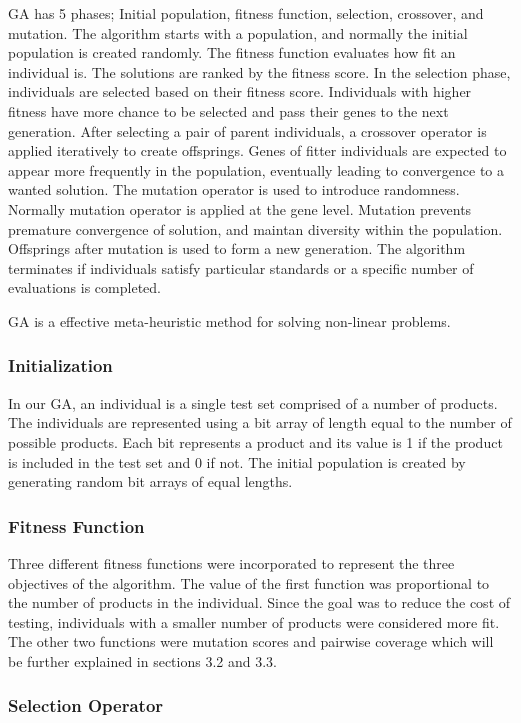 \documentclass[a4paper,12pt]{article}
\begin{document}
GA has 5 phases; Initial population, fitness function, selection, crossover, and mutation.
The algorithm starts with a population, and normally the initial population is created randomly. The fitness function evaluates how fit an individual is. The solutions are ranked by the fitness score. In the selection phase, individuals are selected based on their fitness score. Individuals with higher fitness have more chance to be selected and pass their genes to the next generation. After selecting a pair of parent individuals, a crossover operator is applied iteratively to create offsprings. Genes of fitter individuals are expected to appear more frequently in the population, eventually leading to convergence to a wanted solution. The mutation operator is used to introduce randomness. Normally mutation operator is applied at the gene level. Mutation prevents premature convergence of solution, and maintan diversity within the population. Offsprings after mutation is used to form a new generation. The algorithm terminates if individuals satisfy particular standards or a specific number of evaluations is completed.

GA is a effective meta-heuristic method for solving non-linear problems.

\subsubsection{Initialization}
In our GA, an individual is a single test set comprised of a number of products. The individuals are represented using a bit array of length equal to the number of possible products. Each bit represents a product and its value is 1 if the product is included in the test set and 0 if not. The initial population is created by generating random bit arrays of equal lengths.

\subsubsection {Fitness Function}
Three different fitness functions were incorporated to represent the three objectives of the algorithm. The value of the first function was proportional to the number of products in the individual. Since the goal was to reduce the cost of testing, individuals with a smaller number of products were considered more fit. The other two functions were mutation scores and pairwise coverage which will be further explained in sections 3.2 and 3.3. 


\subsubsection {Selection Operator} 
\end{document}
